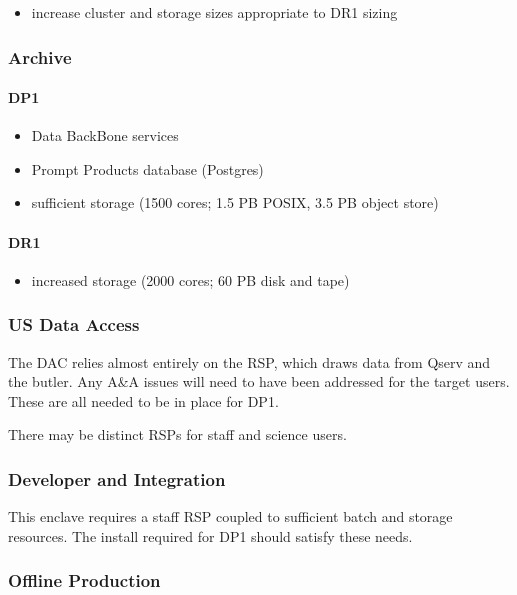  \begin{itemize}
 \item increase cluster and storage sizes appropriate to DR1 sizing
 \end{itemize}

\subsubsection{Archive}

\paragraph{DP1}

\begin{itemize}
\item Data BackBone services
\item Prompt Products database (Postgres)
 \item sufficient storage (1500 cores; 1.5 PB POSIX, 3.5 PB object store)
 \end{itemize}

 \paragraph{DR1}
 

 \begin{itemize}
 \item increased storage (2000 cores; 60 PB disk and tape)
 \end{itemize}
 
\subsubsection{US Data Access}

The DAC relies almost entirely on the \gls{RSP}, which draws data from
Qserv and the butler. Any A\&A issues will need to have been addressed
for the target users. These are all needed to be in place for DP1.

There may be distinct RSPs for staff and science users.

\subsubsection{Developer and Integration}

This enclave requires a staff RSP coupled to sufficient batch and
storage resources. The install required for DP1 should satisfy these needs.

\subsubsection{Offline Production}

